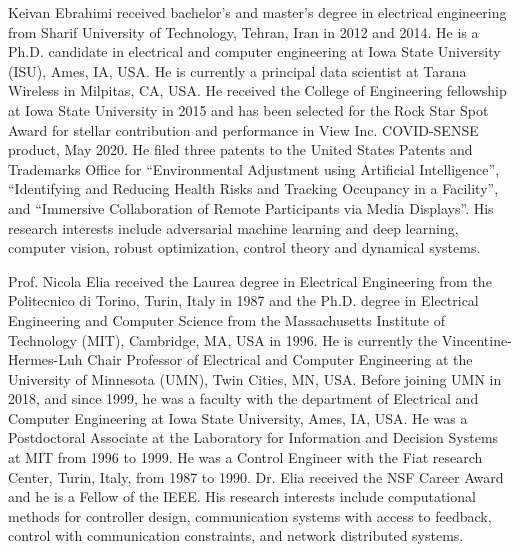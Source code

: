 \documentclass[journal,twoside,web]{ieeecolor}
\begin{document}


\begin{IEEEbiography}
{Keivan Ebrahimi} received bachelor's and master's degree in electrical engineering from Sharif University of Technology, Tehran, Iran in 2012 and 2014. He is a Ph.D. candidate in electrical and computer engineering at Iowa State University (ISU), Ames, IA, USA. He is currently a principal data scientist at Tarana Wireless in Milpitas, CA, USA. He received the College of Engineering fellowship at Iowa State University in 2015 and has been selected for the Rock Star Spot Award for stellar contribution and performance in View Inc. COVID-SENSE product, May 2020. He filed three patents to the United States Patents and Trademarks Office for “Environmental Adjustment using Artificial Intelligence”, “Identifying and Reducing Health Risks and Tracking Occupancy in a Facility”, and “Immersive Collaboration of Remote Participants via Media Displays”. His research interests include adversarial machine learning and deep learning, computer vision, robust optimization, control theory and dynamical systems.
\end{IEEEbiography}

\begin{IEEEbiography}
{Prof. Nicola Elia} received the Laurea degree in Electrical Engineering from the Politecnico di Torino, Turin, Italy in 1987 and the Ph.D. degree in Electrical Engineering and Computer Science from the Massachusetts Institute of Technology (MIT), Cambridge, MA, USA in 1996. He is currently the Vincentine-Hermes-Luh Chair Professor of Electrical and Computer Engineering at the University of Minnesota (UMN), Twin Cities, MN, USA. Before joining UMN in 2018, and since 1999, he was a faculty with the department of Electrical and Computer Engineering at Iowa State University, Ames, IA, USA. He was a Postdoctoral Associate at the Laboratory for Information and Decision Systems at MIT from 1996 to 1999. He was a Control Engineer with the Fiat research Center, Turin, Italy, from 1987 to 1990. Dr. Elia received the NSF Career Award and he is a Fellow of the IEEE. His research interests include computational methods for controller design, communication systems with access to feedback, control with communication constraints, and network distributed systems.
\end{IEEEbiography}
\end{document}
